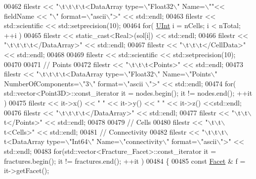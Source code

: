 \begin{DoxyCode}
00462     filestr << \textcolor{stringliteral}{"\(\backslash\)t\(\backslash\)t\(\backslash\)t\(\backslash\)t<DataArray type=\(\backslash\)"Float32\(\backslash\)" Name=\(\backslash\)""}<< fieldName << \textcolor{stringliteral}{"\(\backslash\)" format=\(\backslash\)"ascii\(\backslash\)">"} << 
      std::endl;
00463     filestr << std::scientific << std::setprecision(10);
00464     \textcolor{keywordflow}{for}( \hyperlink{namespaceFVCode3D_a4bf7e328c75d0fd504050d040ebe9eda}{UInt} i = nCells; i < nTotal; ++i )
00465         filestr << static\_cast<Real>(sol[i]) << std::endl;
00466     filestr << \textcolor{stringliteral}{"\(\backslash\)t\(\backslash\)t\(\backslash\)t\(\backslash\)t</DataArray>"} << std::endl;
00467     filestr << \textcolor{stringliteral}{"\(\backslash\)t\(\backslash\)t\(\backslash\)t</CellData>"} << std::endl;
00468 
00469     filestr << std::scientific << std::setprecision(10);
00470 
00471     \textcolor{comment}{// Points}
00472     filestr << \textcolor{stringliteral}{"\(\backslash\)t\(\backslash\)t\(\backslash\)t<Points>"} << std::endl;
00473     filestr << \textcolor{stringliteral}{"\(\backslash\)t\(\backslash\)t\(\backslash\)t\(\backslash\)t<DataArray type=\(\backslash\)"Float32\(\backslash\)" Name=\(\backslash\)"Points\(\backslash\)" NumberOfComponents=\(\backslash\)"3\(\backslash\)" format=\(\backslash\)"ascii
      \(\backslash\)">"} << std::endl;
00474     \textcolor{keywordflow}{for}( std::vector<Point3D>::const\_iterator it = nodes.begin(); it != nodes.end(); ++it )
00475         filestr << it->x() << \textcolor{stringliteral}{" "} << it->y() << \textcolor{stringliteral}{" "} << it->z() <<std::endl;
00476     filestr << \textcolor{stringliteral}{"\(\backslash\)t\(\backslash\)t\(\backslash\)t\(\backslash\)t</DataArray>"} << std::endl;
00477     filestr << \textcolor{stringliteral}{"\(\backslash\)t\(\backslash\)t\(\backslash\)t</Points>"} << std::endl;
00478 
00479     \textcolor{comment}{// Cells}
00480     filestr << \textcolor{stringliteral}{"\(\backslash\)t\(\backslash\)t\(\backslash\)t<Cells>"} << std::endl;
00481     \textcolor{comment}{//  Connectivity}
00482     filestr << \textcolor{stringliteral}{"\(\backslash\)t\(\backslash\)t\(\backslash\)t\(\backslash\)t<DataArray type=\(\backslash\)"Int64\(\backslash\)" Name=\(\backslash\)"connectivity\(\backslash\)" format=\(\backslash\)"ascii\(\backslash\)">"} << std::endl;
00483     \textcolor{keywordflow}{for}(std::vector<Fracture\_Facet>::const\_iterator it = fractures.begin(); it != fractures.end(); ++it )
00484     \{
00485         \textcolor{keyword}{const} \hyperlink{classFVCode3D_1_1Rigid__Mesh_1_1Facet}{Facet} & f = it->getFacet();

\end{DoxyCode}
